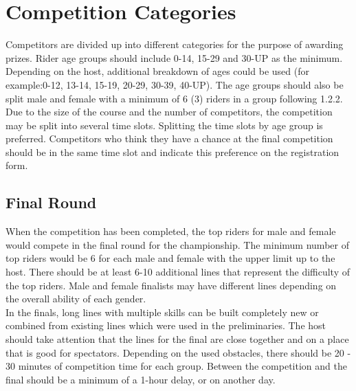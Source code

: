 \section{Competition Categories}
Competitors are divided up into different categories for the purpose of awarding prizes. Rider age groups should include 0-14, 15-29 and 30-UP as the minimum. Depending on the host, additional breakdown of ages could be used (for example:0-12, 13-14, 15-19, 20-29, 30-39, 40-UP). The age groups should also be split male and female with a minimum of 6 (3) riders in a group following 1.2.2. Due to the size of the course and the number of competitors, the competition may be split into several time slots. Splitting the time slots by age group is preferred. Competitors who think they have a chance at the final competition should be in the same time slot and indicate this preference on the registration form.

\subsection{Final Round}
When the competition has been completed, the top riders for male and female would compete in the final round for the championship. The minimum number of top riders would be 6 for each male and female with the upper limit up to the host. There should be at least 6-10 additional lines that represent the difficulty of the top riders. Male and female finalists may have different lines depending on the overall ability of each gender.\\
 In the finals, long lines with multiple skills can be built completely new or combined from existing lines which were used in the preliminaries. The host should take attention that the lines for the final are close together and on a place that is good for spectators. Depending on the used obstacles, there should be 20 - 30 minutes of competition time for each group. Between the competition and the final should be a minimum of a 1-hour delay, or on another day.
 
